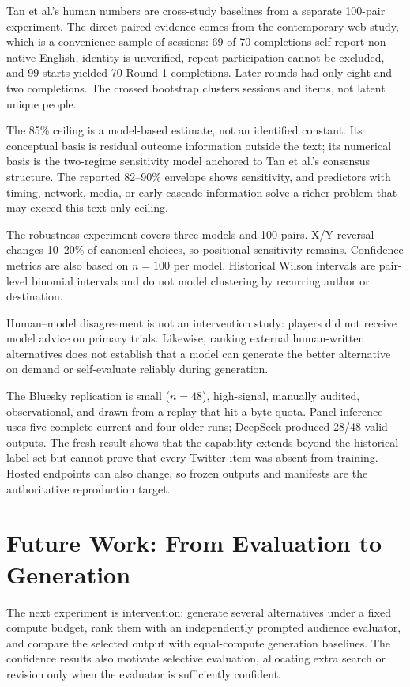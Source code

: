 \documentclass[10pt,twocolumn]{article}
\begin{document}
Tan et al.'s human numbers are cross-study baselines from a separate 100-pair experiment. The direct paired evidence comes from the contemporary web study, which is a convenience sample of sessions: 69 of 70 completions self-report non-native English, identity is unverified, repeat participation cannot be excluded, and 99 starts yielded 70 Round-1 completions. Later rounds had only eight and two completions. The crossed bootstrap clusters sessions and items, not latent unique people.

The 85\% ceiling is a model-based estimate, not an identified constant. Its conceptual basis is residual outcome information outside the text; its numerical basis is the two-regime sensitivity model anchored to Tan et al.'s consensus structure. The reported 82--90\% envelope shows sensitivity, and predictors with timing, network, media, or early-cascade information solve a richer problem that may exceed this text-only ceiling.

The robustness experiment covers three models and 100 pairs. X/Y reversal changes 10--20\% of canonical choices, so positional sensitivity remains. Confidence metrics are also based on $n=100$ per model. Historical Wilson intervals are pair-level binomial intervals and do not model clustering by recurring author or destination.

Human--model disagreement is not an intervention study: players did not receive model advice on primary trials. Likewise, ranking external human-written alternatives does not establish that a model can generate the better alternative on demand or self-evaluate reliably during generation.

The Bluesky replication is small ($n=48$), high-signal, manually audited, observational, and drawn from a replay that hit a byte quota. Panel inference uses five complete current and four older runs; DeepSeek produced 28/48 valid outputs. The fresh result shows that the capability extends beyond the historical label set but cannot prove that every Twitter item was absent from training. Hosted endpoints can also change, so frozen outputs and manifests are the authoritative reproduction target.

\section{Future Work: From Evaluation to Generation}
The next experiment is intervention: generate several alternatives under a fixed compute budget, rank them with an independently prompted audience evaluator, and compare the selected output with equal-compute generation baselines. The confidence results also motivate selective evaluation, allocating extra search or revision only when the evaluator is sufficiently confident.
\end{document}
